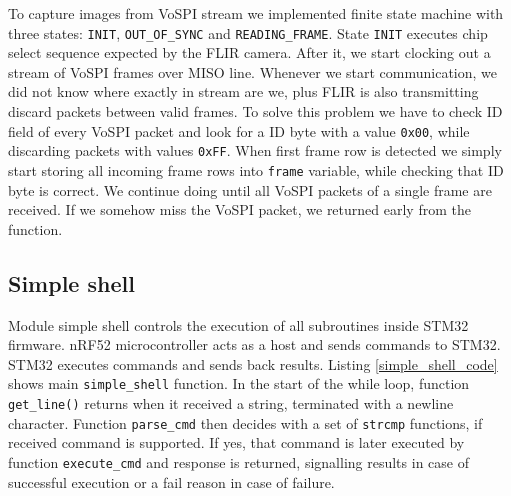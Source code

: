 To capture images from VoSPI stream we implemented finite state machine with three states: \verb|INIT|, \verb|OUT_OF_SYNC| and \verb|READING_FRAME|.
State \verb|INIT| executes chip select sequence expected by the FLIR camera.
After it, we start clocking out a stream of VoSPI frames over MISO line.
Whenever we start communication, we did not know where exactly in stream are we, plus FLIR is also transmitting discard packets between valid frames.
To solve this problem we have to check ID field of every VoSPI packet and look for a ID byte with a value \verb|0x00|, while discarding packets with values \verb|0xFF|.
When first frame row is detected we simply start storing all incoming frame rows into \verb|frame| variable, while checking that ID byte is correct.
We continue doing until all VoSPI packets of a single frame are received.
If we somehow miss the VoSPI packet, we returned early from the function.


\subsection{ Simple shell}

Module simple shell controls the execution of all subroutines inside STM32 firmware.
nRF52 microcontroller acts as a host and sends commands to STM32.
STM32 executes commands and sends back results.
Listing \ref{simple_shell_code} shows main \verb|simple_shell| function.
In the start of the while loop, function \verb|get_line()| returns when it received a string, terminated with a newline character.
Function \verb|parse_cmd| then decides with a set of \verb|strcmp| functions, if received command is supported.
If yes, that command is later executed by function \verb|execute_cmd| and response is returned, signalling results in case of successful execution or a fail reason in case of failure.

